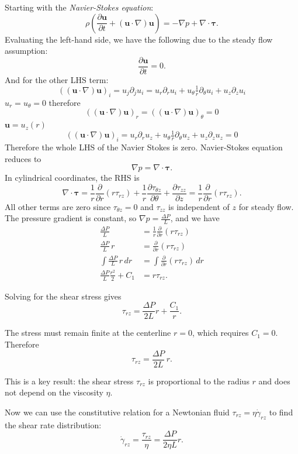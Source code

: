 Starting with the \emph{Navier-Stokes equation}:
\[
	\rho \left( \frac{\partial \mathbf{u}}{\partial t} + (\mathbf{u}\cdot\nabla)\mathbf{u} \right) = -\nabla p + \nabla\cdot\boldsymbol{\tau}.
\]
Evaluating the left-hand side, we have the following due to the steady flow assumption:
\[
	\frac{\partial \mathbf{u}}{\partial t} = 0.
\]
And for the other LHS term:
\[
	((\mathbf{u}\cdot\nabla)\mathbf{u})_i
	= u_j \partial_j u_i
	= u_r \partial_r u_i + u_\theta \tfrac1r\partial_\theta u_i + u_z \partial_z u_i
\]
$u_r = u_\theta = 0$ therefore
\[
	((\mathbf{u}\cdot\nabla)\mathbf{u})_r = 
	((\mathbf{u}\cdot\nabla)\mathbf{u})_\theta = 0
\]
$\mathbf{u} = u_z(r)$
\[
	((\mathbf{u}\cdot\nabla)\mathbf{u})_i
	= u_r \partial_r u_z + u_\theta \tfrac1r\partial_\theta u_z + u_z \partial_z u_z = 0
\]
Therefore the whole LHS of the Navier Stokes is zero. Navier-Stokes equation reduces to
\[
	\nabla p = \nabla\cdot\boldsymbol{\tau}.
\]
In cylindrical coordinates, the RHS is 
\[
	\nabla\cdot\boldsymbol{\tau} = 
	\frac{1}{r}\frac{\partial}{\partial r}(r\tau_{rz}) + 
	\frac{1}{r}\frac{\partial \tau_{\theta z}}{\partial \theta} + 
	\frac{\partial \tau_{zz}}{\partial z}
	= \frac{1}{r}\frac{\partial}{\partial r}(r\tau_{rz}).
\]
All other terms are zero since $\tau_{\theta z} = 0$ and $\tau_{zz}$ is independent of $z$ for steady flow. The pressure gradient is constant, so $\nabla p = \frac{\Delta P}{L}$, and we have
\begin{align*}
	\frac{\Delta P}{L} &= \frac{1}{r}\frac{\partial}{\partial r}(r\tau_{rz})\\
	\frac{\Delta P}{L}\, r &= \frac{\partial}{\partial r}(r\tau_{rz})\\
	\int \frac{\Delta P}{L}\, r\,dr
	&= \int \frac{\partial}{\partial r}(r\tau_{rz})\,dr\\
	\frac{\Delta P}{L}\frac{r^2}{2} + C_1
	&= r\tau_{rz}.
\end{align*}

Solving for the shear stress gives
\[
	\tau_{rz}
	=
	\frac{\Delta P}{2L} r + \frac{C_1}{r}.
\]

The stress must remain finite at the centerline $r=0$, which requires $C_1 = 0$. Therefore
\[
	\boxed{\tau_{rz} = \frac{\Delta P}{2L}\, r}.
\]

This is a key result: the shear stress $\tau_{rz}$ is proportional to the radius $r$ and does not depend on the viscosity $\eta$.

Now we can use the constitutive relation for a Newtonian fluid $\tau_{rz} = \eta \dot\gamma_{rz}$ to find the shear rate distribution:
\[
	\dot\gamma_{rz}
	=
	\frac{\tau_{rz}}{\eta}
	=
	\frac{\Delta P}{2\eta L} r.
\]

